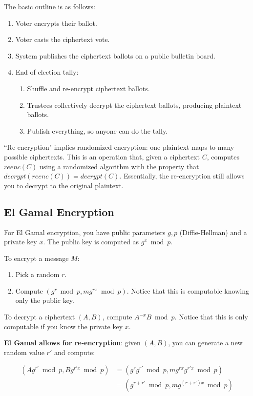\documentclass[12pt]{article}
\begin{document}
The basic outline is as follows:
\begin{enumerate}
\item Voter encrypts their ballot.
\item Voter casts the ciphertext vote.
\item System publishes the ciphertext ballots on a public bulletin board.
\item End of election tally:
\begin{enumerate}
\item Shuffle and re-encrypt ciphertext ballots.
\item Trustees collectively decrypt the ciphertext ballots, producing plaintext ballots.
\item Publish everything, so anyone can do the tally.
\end{enumerate}
\end{enumerate}

``Re-encryption" implies randomized encryption: one plaintext maps to many possible ciphertexts. This is an operation that, given a ciphertext $C$, computes $reenc(C)$ using a randomized algorithm with the property that $decrypt(reenc(C)) = decrypt(C)$. Essentially, the re-encryption still allows you to decrypt to the original plaintext.

\subsection*{El Gamal Encryption}

For El Gamal encryption, you have public parameters $g, p$ (Diffie-Hellman) and a private key $x$. The public key is computed as $g^x \bmod{p}$.

To encrypt a message $M$:
\begin{enumerate}
\item Pick a random $r$.
\item Compute $(g^r \bmod{p}, m g^{rx} \bmod{p})$. Notice that this is computable knowing only the public key.
\end{enumerate}

To decrypt a ciphertext $(A, B)$, compute $A^{-x}B \bmod{p}$. Notice that this is only computable if you know the private key $x$.

\textbf{El Gamal allows for re-encryption}: given $(A, B)$, you can generate a new random value $r'$ and compute:

\begin{align*}
(A g^{r'} \bmod{p}, B g^{r'x} \bmod{p}) &= (g^r g^{r'} \bmod{p}, m g^{rx} g^{r'x} \bmod{p}) \\
&= (g^{r+r'} \bmod{p}, m g^{(r+r')x} \bmod{p})
\end{align*}
\end{document}
